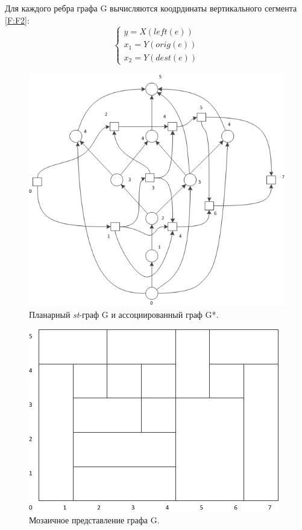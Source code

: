 Для каждого ребра графа G вычисляются коодрдинаты вертикального сегмента \ref{F:F2}:
\begin{equation}
	\begin{cases}
	y = X(left(e)) \\
	x_{1} = Y(orig(e)) \\
	x_{2} = Y(dest(e))
	\end{cases}
\label{F:F2}
\end{equation}

\begin{figure}
	\begin{center}
		\includegraphics[scale=1]{include/Graph.png}
	\end{center}
	\caption{Планарный \textit{st}-граф G и ассоциированный граф G*.}
	\label{fig:fig9}
\end{figure}

\begin{figure}
	\begin{center}
		\includegraphics[scale=1]{include/MosaicView.png}
	\end{center}
	\caption{Мозаичное представление графа G.}
	\label{fig:fig10}
\end{figure}

